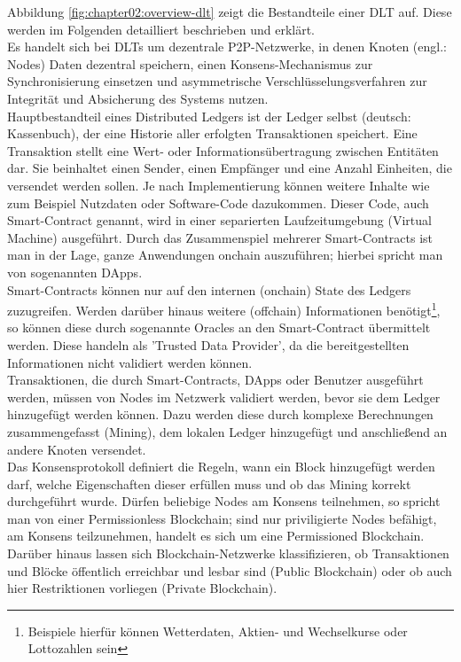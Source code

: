 Abbildung \ref{fig:chapter02:overview-dlt} zeigt die Bestandteile einer \ac{DLT} auf. Diese werden im Folgenden detailliert beschrieben und erklärt.\\
Es handelt sich bei \acp{DLT} um dezentrale \ac{P2P}-Netzwerke, in denen Knoten (engl.: Nodes) Daten dezentral speichern, einen Konsens-Mechanismus zur Synchronisierung einsetzen und asymmetrische Verschlüsselungsverfahren zur Integrität und Absicherung des Systems nutzen. \cite{DLT2016}\\
Hauptbestandteil eines Distributed Ledgers ist der Ledger selbst (deutsch: Kassenbuch), der eine Historie aller erfolgten Transaktionen speichert. Eine Transaktion stellt eine Wert- oder Informationsübertragung zwischen Entitäten dar. Sie beinhaltet einen Sender, einen Empfänger und eine Anzahl Einheiten, die versendet werden sollen. Je nach Implementierung können weitere Inhalte wie zum Beispiel Nutzdaten oder Software-Code dazukommen. Dieser Code, auch Smart-Contract genannt, wird in einer separierten Laufzeitumgebung (Virtual Machine) ausgeführt. Durch das Zusammenspiel mehrerer Smart-Contracts ist man in der Lage, ganze Anwendungen onchain auszuführen; hierbei spricht man von sogenannten \acp{DApp}.\\
Smart-Contracts können nur auf den internen (onchain) State des Ledgers zuzugreifen. Werden darüber hinaus weitere (offchain) Informationen benötigt\footnote{Beispiele hierfür können Wetterdaten, Aktien- und Wechselkurse oder Lottozahlen sein}, so können diese durch sogenannte Oracles an den Smart-Contract übermittelt werden. Diese handeln als 'Trusted Data Provider', da die bereitgestellten Informationen nicht validiert werden können. \cite{ORACLE2019}\\
Transaktionen, die durch Smart-Contracts, \acp{DApp} oder Benutzer ausgeführt werden, müssen von Nodes im Netzwerk validiert werden, bevor sie dem Ledger hinzugefügt werden können. Dazu werden diese durch komplexe Berechnungen zusammengefasst (Mining), dem lokalen Ledger hinzugefügt und anschließend an andere Knoten versendet.\\
Das Konsensprotokoll definiert die Regeln, wann ein Block hinzugefügt werden darf, welche Eigenschaften dieser erfüllen muss und ob das Mining korrekt durchgeführt wurde. Dürfen beliebige Nodes am Konsens teilnehmen, so spricht man von einer Permissionless Blockchain; sind nur priviligierte Nodes befähigt, am Konsens teilzunehmen, handelt es sich um eine Permissioned Blockchain. Darüber hinaus lassen sich Blockchain-Netzwerke klassifizieren, ob Transaktionen und Blöcke öffentlich erreichbar und lesbar sind (Public Blockchain) oder ob auch hier Restriktionen vorliegen (Private Blockchain).\\
